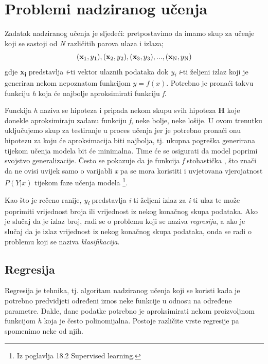 \documentclass[times, utf8, zavrsni]{fer}
\begin{document}
\section{Problemi nadziranog učenja}

Zadatak nadziranog učenja je sljedeći: pretpostavimo da imamo skup za učenje koji se sastoji od \textit{N} različitih parova ulaza i izlaza;
\[(\textbf{x}\textsubscript{1}, y\textsubscript{1}), (\textbf{x}\textsubscript{2}, y\textsubscript{2}),
(\textbf{x}\textsubscript{3}, y\textsubscript{3}),...,
(\textbf{x}\textsubscript{N}, y\textsubscript{N})\]
gdje \textbf{x\textsubscript{i}} predstavlja \textit{i}-ti vektor ulaznih podataka dok \textit{y\textsubscript{i}} \textit{i}-ti željeni izlaz koji je generiran nekom nepoznatom funkcijom $y=f(x)$. \newline
Potrebno je pronaći takvu funkciju \textit{h} koja će najbolje aproksimirati funkciju \textit{f}.

Funckija \textit{h} naziva se hipoteza  i pripada nekom skupu svih hipoteza \textbf{H} koje donekle aproksimiraju zadanu funkciju \textit{f}, neke bolje, neke lošije. U ovom trenutku uključujemo skup za testiranje u proces učenja jer je potrebno pronaći onu hipotezu za koju će aproksimacija biti najbolja, tj. ukupna pogreška generirana tijekom učenja modela bit će minimalna. Time će se osigurati da model poprimi svojstvo generalizacije. Često se pokazuje da je funkcija \textit{f} stohastička , što znači da ne ovisi uvijek samo o varijabli \textit{x} pa se mora koristiti i uvjetovana vjerojatnost $P(Y|x)$ tijekom faze učenja modela \citep{russelAI}\footnote{Iz poglavlja 18.2 Supervised learning.}.

Kao što je rečeno ranije, \textit{y\textsubscript{i}} predstavlja \textit{i}-ti željeni izlaz za \textit{i}-ti ulaz te može poprimiti vrijednost broja ili vrijednost iz nekog konačnog skupa podataka. Ako je slučaj da je izlaz broj, radi se o problemu koji se naziva \textit{regresija}, a ako je slučaj da je izlaz vrijednost iz nekog konačnog skupa podataka, onda se radi o problemu koji se naziva \textit{klasifikacija}.

\subsection{Regresija}
Regresija  je tehnika, tj. algoritam nadziranog učenja koji se koristi kada je potrebno predvidjeti određeni iznos neke funkcije u odnosu na određene parametre. Dakle, dane podatke potrebno je aproksimirati nekom proizvoljnom funkcijom \textit{h} koja je često polinomijalna. Postoje različite vrste regresije pa spomenimo neke od njih. 
\end{document}
